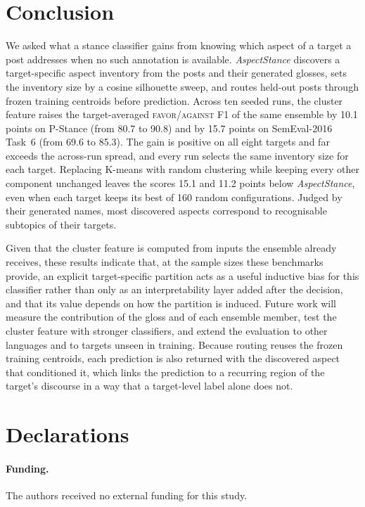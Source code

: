 \documentclass[pdflatex,sn-mathphys-num,iicol]{sn-jnl}%
\begin{document}
\section{Conclusion}\label{sec8}

We asked what a stance classifier gains from knowing which aspect of a target a post addresses when no such annotation is available. \textit{AspectStance} discovers a target-specific aspect inventory from the posts and their generated glosses, sets the inventory size by a cosine silhouette sweep, and routes held-out posts through frozen training centroids before prediction. Across ten seeded runs, the cluster feature raises the target-averaged \textsc{favor}/\textsc{against} F1 of the same ensemble by 10.1 points on P-Stance (from 80.7 to 90.8) and by 15.7 points on SemEval-2016 Task~6 (from 69.6 to 85.3). The gain is positive on all eight targets and far exceeds the across-run spread, and every run selects the same inventory size for each target. Replacing K-means with random clustering while keeping every other component unchanged leaves the scores 15.1 and 11.2 points below \textit{AspectStance}, even when each target keeps its best of 160 random configurations. Judged by their generated names, most discovered aspects correspond to recognisable subtopics of their targets.

Given that the cluster feature is computed from inputs the ensemble already receives, these results indicate that, at the sample sizes these benchmarks provide, an explicit target-specific partition acts as a useful inductive bias for this classifier rather than only as an interpretability layer added after the decision, and that its value depends on how the partition is induced. Future work will measure the contribution of the gloss and of each ensemble member, test the cluster feature with stronger classifiers, and extend the evaluation to other languages and to targets unseen in training. Because routing reuses the frozen training centroids, each prediction is also returned with the discovered aspect that conditioned it, which links the prediction to a recurring region of the target's discourse in a way that a target-level label alone does not.

\section*{Declarations}

\paragraph{Funding.} The authors received no external funding for this study.
\end{document}
